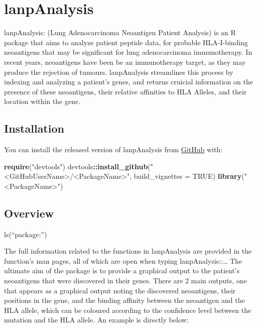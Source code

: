 \documentclass[
]{article}
\author{}
\date{\vspace{-2.5em}}
\newenvironment{Shaded}{\begin{snugshade}}{\end{snugshade}}
\newcommand{\DataTypeTok}[1]{\textcolor[rgb]{0.13,0.29,0.53}{#1}}
\newcommand{\KeywordTok}[1]{\textcolor[rgb]{0.13,0.29,0.53}{\textbf{#1}}}
\newcommand{\NormalTok}[1]{#1}
\newcommand{\OperatorTok}[1]{\textcolor[rgb]{0.81,0.36,0.00}{\textbf{#1}}}
\newcommand{\OtherTok}[1]{\textcolor[rgb]{0.56,0.35,0.01}{#1}}
\newcommand{\StringTok}[1]{\textcolor[rgb]{0.31,0.60,0.02}{#1}}
\begin{document}
\hypertarget{lanpanalysis}{%
\section{lanpAnalysis}\label{lanpanalysis}}

lanpAnalysis: (Lung Adenocarcinoma Neoantigen Patient Analysis) is an R
package that aims to analyze patient peptide data, for probable
HLA-I-binding neoantigens that may be significant for lung
adenocarcinoma immunotherapy. In recent years, neoantigens have been be
an immunotherapy target, as they may produce the rejection of tumours.
lanpAnalysis streamlines this process by indexing and analyzing a
patient's genes, and returns cruicial information on the presence of
these neoantigens, their relative affinities to HLA Alleles, and their
location within the gene.

\hypertarget{installation}{%
\subsection{Installation}\label{installation}}

You can install the released version of lanpAnalysis from
\href{https://github.com/}{GitHub} with:

\begin{Shaded}
\begin{Highlighting}[]
\KeywordTok{require}\NormalTok{(}\StringTok{"devtools"}\NormalTok{)}
\NormalTok{devtools}\OperatorTok{::}\KeywordTok{install_github}\NormalTok{(}\StringTok{"<GitHubUserName>/<PackageName>"}\NormalTok{, }\DataTypeTok{build_vignettes =} \OtherTok{TRUE}\NormalTok{)}
\KeywordTok{library}\NormalTok{(}\StringTok{"<PackageName>"}\NormalTok{)}
\end{Highlighting}
\end{Shaded}

\hypertarget{overview}{%
\subsection{Overview}\label{overview}}

ls(``package:'')

The full information related to the functions in lanpAnalysis are
provided in the function's man pages, all of which are open when typing
lanpAnalysis::\ldots{} The ultimate aim of the package is to provide a
graphical output to the patient's neoantigens that were discovered in
their genes. There are 2 main outputs, one that appears as a graphical
output noting the discovered neoantigens, their positions in the gene,
and the binding affinity between the neoantigen and the HLA allele,
which can be coloured according to the confidence level between the
mutation and the HLA allele. An example is directly below:
\end{document}
